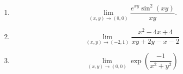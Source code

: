 \begin{exercice}
\begin{multicols}{2}
\begin{enumerate}
			\item %
				\[ 
					\lim_{(x,y)\to(0,0)}\frac{  e^{xy}\sin^2(xy) }{ xy }.
				\]
			\item	%
				\[ 
					\lim_{(x,y)\to(-2,1)}\frac{ x^2-4x+4 }{ xy+2y-x-2 }
				\]
			\item	%
				\[ 
					\lim_{(x,y)\to(0,0)}\exp\left( \frac{ -1 }{ x^2+y^2 } \right)	
				\]

		\end{enumerate}

	\end{multicols}
	
\end{exercice}
